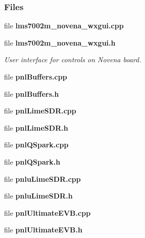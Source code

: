 \subsubsection*{Files}
\begin{DoxyCompactItemize}
\item 
file {\bf lms7002m\+\_\+novena\+\_\+wxgui.\+cpp}
\item 
file {\bf lms7002m\+\_\+novena\+\_\+wxgui.\+h}
\begin{DoxyCompactList}\small\item\em User interface for controls on Novena board. \end{DoxyCompactList}\item 
file {\bf pnl\+Buffers.\+cpp}
\item 
file {\bf pnl\+Buffers.\+h}
\item 
file {\bf pnl\+Lime\+S\+D\+R.\+cpp}
\item 
file {\bf pnl\+Lime\+S\+D\+R.\+h}
\item 
file {\bf pnl\+Q\+Spark.\+cpp}
\item 
file {\bf pnl\+Q\+Spark.\+h}
\item 
file {\bf pnlu\+Lime\+S\+D\+R.\+cpp}
\item 
file {\bf pnlu\+Lime\+S\+D\+R.\+h}
\item 
file {\bf pnl\+Ultimate\+E\+V\+B.\+cpp}
\item 
file {\bf pnl\+Ultimate\+E\+V\+B.\+h}
\end{DoxyCompactItemize}
